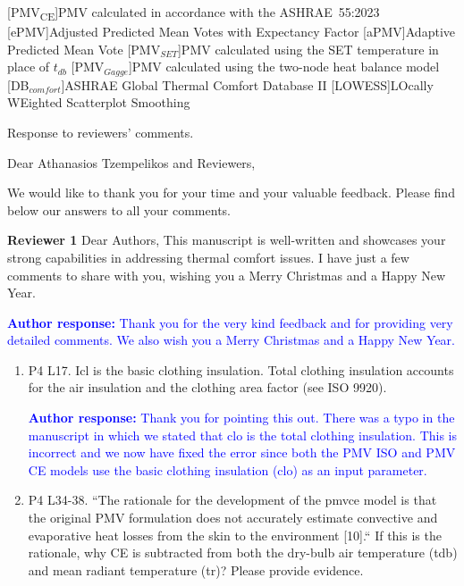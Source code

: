 \documentclass[a4paper, 10pt]{letter}
\newcommand{\response}[1]{\textcolor{blue}{\textbf{Author response:} #1}}
\begin{document}
    [PMV\textsubscript{CE}]{PMV calculated in accordance with the ASHRAE~55:2023}
    [ePMV]{Adjusted Predicted Mean Votes with Expectancy Factor}
    [aPMV]{Adaptive Predicted Mean Vote}
    [PMV$_{SET}$]{PMV calculated using the SET temperature in place of $t_{db}$}
    [PMV$_{Gagge}$]{PMV calculated using the two-node heat balance model}
    [DB$_{comfort}$]{ASHRAE Global Thermal Comfort Database II}
    [LOWESS]{LOcally WEighted Scatterplot Smoothing}

    \renewcommand{\baselinestretch}{1}\normalsize

    \begin{letter}
    {
        Response to reviewers' comments.
    }

        \opening{Dear Athanasios Tzempelikos and Reviewers,}


        We would like to thank you for your time and your valuable feedback.
        Please find below our answers to all your comments.

        \textbf{Reviewer 1}
        Dear Authors,
        This manuscript is well-written and showcases your strong capabilities in addressing thermal comfort issues.
        I have just a few comments to share with you, wishing you a Merry Christmas and a Happy New Year.

        \response{
            Thank you for the very kind feedback and for providing very detailed comments.
            We also wish you a Merry Christmas and a Happy New Year.
        }

        \begin{enumerate}

            \item P4 L17.
            Icl is the basic clothing insulation.
            Total clothing insulation accounts for the air insulation and the clothing area factor (see ISO 9920).

            \response{
                Thank you for pointing this out.
                There was a typo in the manuscript in which we stated that \ac{clo} is the total clothing insulation.
                This is incorrect and we now have fixed the error since both the PMV ISO and PMV CE models use the basic clothing insulation (\ac{clo}) as an input parameter.
            }

            \item P4 L34-38.
            ``The rationale for the development of the \acs{pmvce} model is that the original PMV
            formulation does not accurately estimate convective and evaporative heat losses from
            the skin to the environment [10].`` If this is the rationale, why CE is subtracted from both
            the dry-bulb air temperature (tdb) and mean radiant temperature (tr)?
            Please provide evidence.


\end{enumerate}
\end{letter}
\end{document}
